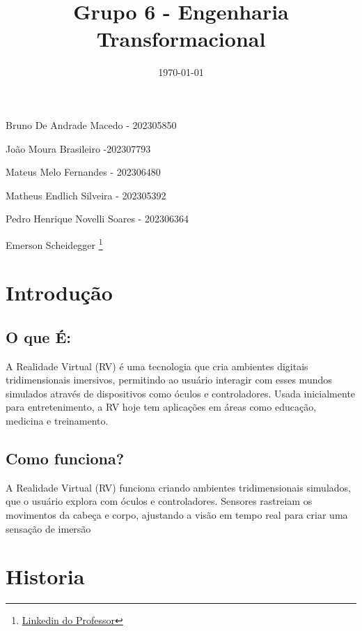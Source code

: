 \documentclass[article,a4paper,12pt,brazil,sumario=tradicional]{abntex2}
\title{Grupo 6 - Engenharia Transformacional}
\date{\today}
\begin{document}
\maketitle
\begin{flushright}
Bruno De Andrade Macedo - 202305850

João Moura Brasileiro  -202307793

Mateus Melo Fernandes - 202306480

Matheus Endlich Silveira - 202305392

Pedro Henrique Novelli Soares - 202306364

\vspace{10px}

Emerson Scheidegger
\footnote{\label{Professor}\href{https://br.linkedin.com/in/emersonsch}{Linkedin do Professor}} 

\end{flushright}
\newpage
\tableofcontents
\newpage

\section{Introdução}
    \subsection{O que É:}
    A Realidade Virtual (RV) é uma tecnologia que cria ambientes digitais tridimensionais imersivos, permitindo ao usuário interagir com esses mundos simulados através de dispositivos como óculos e controladores. Usada inicialmente para entretenimento, a RV hoje tem aplicações em áreas como educação, medicina e treinamento.
    \subsection{Como funciona?}
    A Realidade Virtual (RV) funciona criando ambientes tridimensionais simulados, que o usuário explora com óculos e controladores. Sensores rastreiam os movimentos da cabeça e corpo, ajustando a visão em tempo real para criar uma sensação de imersão
\section{Historia}
    \vspace{15 px}
\end{document}
